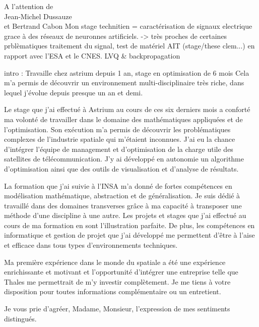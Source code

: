 \documentclass[12pt]{lettre}
\begin{document}
\begin{letter}{A l'attention de\\Jean-Michel Dussauze\\et Bertrand Cabon}
Mon stage technitien = caractérisation de signaux electrique grace à des réseaux de neuronnes artificiels. -> très proches de certaines prblèmatiques traitement du signal, test de matériel AIT (stage/these clem...) en rapport avec l'ESA et le CNES. LVQ \& backpropagation


intro : Travaille chez astrium depuis 1 an, stage en optimisation de 6 mois
Cela m'a permis de découvrir un environnement multi-disciplinaire très riche, dans lequel j'évolue depuis presque un an et demi.


Le stage que j'ai effectué à Astrium au cours de ces six derniers mois a conforté ma volonté de travailler dans le domaine des mathématiques appliquées et de l'optimisation. Son exécution m'a permis de découvrir les problématiques complexes de l'industrie spatiale qui m'étaient inconnues. J'ai eu la chance d'intégrer l'équipe de management et d'optimisation de la charge utile des satellites de télécommunication. J'y ai développé en autonomie un algorithme d'optimisation ainsi que des outils de visualisation et d'analyse de résultats.

La formation que j'ai suivie à l'INSA m'a donné de fortes compétences en modélisation mathématique, abstraction et de généralisation. Je suis dédié à travaillé dans des domaines transverses grâce à ma capacité à transposer une méthode d'une discipline à une autre. Les projets et stages que j'ai effectué au cours de ma formation en sont l'illustration parfaite. De plus, les compétences en informatique et gestion de projet que j'ai développé me permettent d'être à l'aise et efficace dans tous types d'environnements techniques.%

Ma première expérience dans le monde du spatiale a été une expérience enrichissante et motivant et l'opportunité d'intégrer une entreprise  telle que Thales me permettrait de m'y investir complètement.
%
Je me tiens à votre disposition pour toutes informations complémentaire ou un entretient.
\closing{Je vous prie d'agréer, Madame, Monsieur, l'expression de mes sentiments distingués.}
\end{letter}
\end{document}
